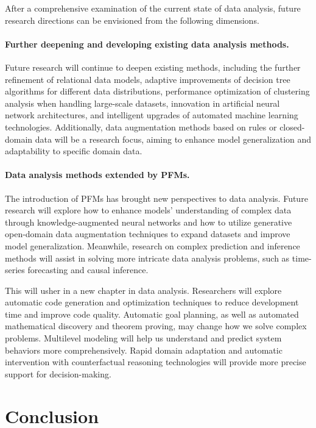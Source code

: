 After a comprehensive examination of the current state of data analysis, future research directions can be envisioned from the following dimensions.
  
\paragraph{Further deepening and developing existing data analysis methods.} Future research will continue to deepen existing methods, including the further refinement of relational data models, adaptive improvements of decision tree algorithms for different data distributions, performance optimization of clustering analysis when handling large-scale datasets, innovation in artificial neural network architectures, and intelligent upgrades of automated machine learning technologies. Additionally, data augmentation methods based on rules or closed-domain data will be a research focus, aiming to enhance model generalization and adaptability to specific domain data.
  
\paragraph{Data analysis methods extended by PFMs.} The introduction of PFMs has brought new perspectives to data analysis. Future research will explore how to enhance models' understanding of complex data through knowledge-augmented neural networks and how to utilize generative open-domain data augmentation techniques to expand datasets and improve model generalization. Meanwhile, research on complex prediction and inference methods will assist in solving more intricate data analysis problems, such as time-series forecasting and causal inference.
  
This will usher in a new chapter in data analysis. Researchers will explore automatic code generation and optimization techniques to reduce development time and improve code quality. Automatic goal planning, as well as automated mathematical discovery and theorem proving, may change how we solve complex problems. Multilevel modeling will help us understand and predict system behaviors more comprehensively. Rapid domain adaptation and automatic intervention with counterfactual reasoning technologies will provide more precise support for decision-making.
  
  \section{Conclusion}
  
